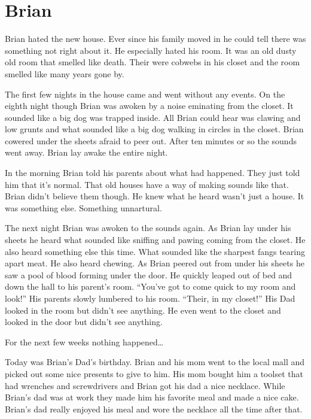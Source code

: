 \chapter{Brian}



Brian hated the new house. Ever since his family moved in he could tell
there was something not right about it. He especially hated his room. It
was an old dusty old room that smelled like death. Their were cobwebs in
his closet and the room smelled like many years gone by.



The first few nights in the house came and went without any events.
On the eighth night though Brian was awoken by a noise eminating
from the closet. It sounded like a big dog was trapped inside. All
Brian could hear was clawing and low grunts and what sounded like a
big dog walking in circles in the closet. Brian cowered under the
sheets afraid to peer out. After ten minutes or so the sounds went
away. Brian lay awake the entire night.



In the morning Brian told his parents about what had happened. They
just told him that it's normal. That old houses have a way of
making sounds like that. Brian didn't believe them though. He knew
what he heard wasn't just a house. It was something else. Something
unnartural.



The next night Brian was awoken to the sounds again. As Brian lay
under his sheets he heard what sounded like sniffing and pawing
coming from the closet. He also heard something else this time.
What sounded like the sharpest fangs tearing apart meat. He also
heard chewing. As Brian peered out from under his sheets he saw a
pool of blood forming under the door. He quickly leaped out of bed
and down the hall to his parent's room. ``You've got to come quick
to my room and look!'' His parents slowly lumbered to his room.
``Their, in my closet!'' His Dad looked in the room but didn't see
anything. He even went to the closet and looked in the door but
didn't see anything.



For the next few weeks nothing happened{\ldots}



Today was Brian's Dad's birthday. Brian and his mom went to the
local mall and picked out some nice presents to give to him. His
mom bought him a toolset that had wrenches and screwdrivers and
Brian got his dad a nice necklace. While Brian's dad was at work
they made him his favorite meal and made a nice cake. Brian's dad
really enjoyed his meal and wore the necklace all the time after
that.



